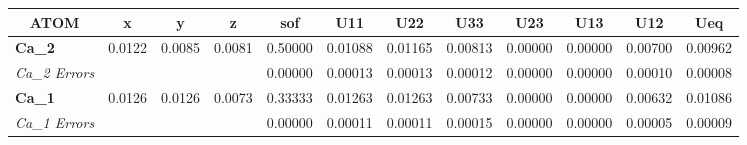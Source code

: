 \documentclass[]{scrartcl}
\begin{document}
\begin{table}[]
	\centering
	\setlength\tabcolsep{2pt}
	\begin{tabular}{|l|l|l|l|l|l|l|l|l|l|l|l|}
		\hline
		\multicolumn{1}{|c|}{\textbf{ATOM} \cellcolor{Aquamarine}} & \multicolumn{1}{c|}{\cellcolor{Aquamarine} \textbf{x}} & \multicolumn{1}{c|}{\cellcolor{Aquamarine} \textbf{y}} & \multicolumn{1}{c|}{\cellcolor{Aquamarine} \textbf{z}} & \multicolumn{1}{c|}{\cellcolor{Aquamarine} \textbf{sof}} & \multicolumn{1}{c|}{\cellcolor{Aquamarine} \textbf{U11}} & \multicolumn{1}{c|}{\cellcolor{Aquamarine} \textbf{U22}} & \multicolumn{1}{c|}{\cellcolor{Aquamarine} \textbf{U33}} & \multicolumn{1}{c|}{\cellcolor{Aquamarine} \textbf{U23}} & \multicolumn{1}{c|}{\cellcolor{Aquamarine} \textbf{U13}} & \multicolumn{1}{c|}{\cellcolor{Aquamarine} \textbf{U12}} & \multicolumn{1}{c|}{\cellcolor{Aquamarine} \textbf{Ueq}} \\ \hline
		\textbf{Ca\_2}                        & 0.0122                          & 0.0085                          & 0.0081                          & 0.50000                           & 0.01088                           & 0.01165                           & 0.00813                           & 0.00000                           & 0.00000                           & 0.00700                           & 0.00962                           \\ \hline
		\textit{Ca\_2 Errors}                           &                                 &                                 &                                 & 0.00000                           & 0.00013                           & 0.00013                           & 0.00012                           & 0.00000                           & 0.00000                           & 0.00010                           & 0.00008                           \\ \hline
		\textbf{Ca\_1}                        & 0.0126                          & 0.0126                          & 0.0073                          & 0.33333                           & 0.01263                           & 0.01263                           & 0.00733                           & 0.00000                           & 0.00000                           & 0.00632                           & 0.01086                           \\ \hline
		\textit{Ca\_1 Errors}                           &                                 &                                 &                                 & 0.00000                           & 0.00011                           & 0.00011                           & 0.00015                           & 0.00000                           & 0.00000                           & 0.00005                           & 0.00009                           \\ \hline

\end{tabular}
\end{table}
\end{document}
